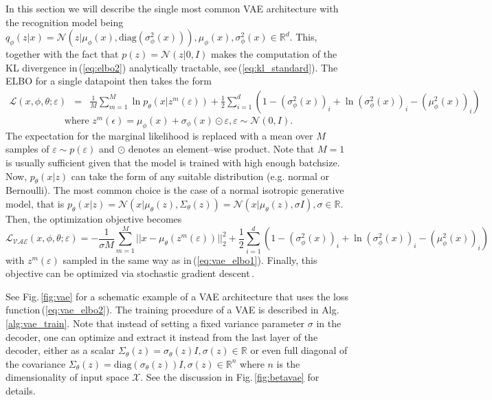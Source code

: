 In this section we will describe the single most common VAE architecture
with the recognition model being $q_{\phi}(z|x)=\mathcal{N}(z|\mu_{\phi}(x),\text{diag}(\sigma_{\phi}^{2}(x))),\mu_{\phi}(x),\sigma_{\phi}^{2}(x)\in\mathbb{R}^{d}$.
This, together with the fact that $p(z)=\mathcal{N}(z|0,I)$ makes
the computation of the KL divergence in\,(\ref{eq:elbo2}) analytically
tractable, see\,(\ref{eq:kl_standard}). The ELBO for a single datapoint
then takes the form
\begin{eqnarray*}
\mathcal{L}(x,\phi,\theta;\varepsilon) & = & \frac{1}{M}\sum_{m=1}^{M}\ln p_{\theta}(x|z^{m}(\varepsilon))+\frac{1}{2}\sum_{i=1}^{d}\left(1-\left(\sigma_{\phi}^{2}(x)\right)_{i}+\ln\left(\sigma_{\phi}^{2}(x)\right)_{i}-\left(\mu_{\phi}^{2}(x)\right)_{i}\right)
\end{eqnarray*}
\begin{equation}
\text{where }z^{m}(\epsilon)=\mu_{\phi}(x)+\sigma_{\phi}(x)\odot\varepsilon,\varepsilon\sim\mathcal{N}(0,I).\label{eq:vae_elbo1}
\end{equation}
The expectation for the marginal likelihood is replaced with a mean
over $M$ samples of $\varepsilon\sim p(\varepsilon)$ and $\odot$
denotes an element--wise product. Note that $M=1$ is usually sufficient
given that the model is trained with high enough batchsize. Now, $p_{\theta}(x|z)$
can take the form of any suitable distribution (e.g. normal or Bernoulli).
The most common choice is the case of a normal isotropic generative
model, that is $p_{\theta}(x|z)=\mathcal{N}(x|\mu_{\theta}(z),\Sigma_{\theta}(z))=\mathcal{N}(x|\mu_{\theta}(z),\sigma I),\sigma\in\mathbb{R}$.
Then, the optimization objective becomes
\begin{equation}
\mathcal{L_{\text{VAE}}}(x,\phi,\theta;\varepsilon)=-\frac{1}{\sigma M}\sum_{m=1}^{M}||x-\mu_{\theta}(z^{m}(\varepsilon))||_{2}^{2}+\frac{1}{2}\sum_{i=1}^{d}\left(1-\left(\sigma_{\phi}^{2}(x)\right)_{i}+\ln\left(\sigma_{\phi}^{2}(x)\right)_{i}-\left(\mu_{\phi}^{2}(x)\right)_{i}\right)\label{eq:vae_elbo2}
\end{equation}
with $z^{m}(\varepsilon)$ sampled in the same way as in\,(\ref{eq:vae_elbo1}).
Finally, this objective can be optimized via stochastic gradient descent\,\cite{bottou2010large}.

See Fig.\,\ref{fig:vae} for a schematic example of a VAE architecture
that uses the loss function\,(\ref{eq:vae_elbo2}). The training
procedure of a VAE is described in Alg.\,\ref{alg:vae_train}. Note
that instead of setting a fixed variance parameter $\sigma$ in the
decoder, one can optimize and extract it instead from the last layer
of the decoder, either as a scalar $\Sigma_{\theta}(z)=\sigma_{\theta}(z)I,\sigma(z)\in\mathbb{R}$
or even full diagonal of the covariance $\Sigma_{\theta}(z)=\text{diag}\left(\sigma_{\theta}(z)\right)I,\sigma(z)\in\mathbb{R}^{n}$
where $n$ is the dimensionality of input space $\mathcal{X}$. See
the discussion in Fig.\,\ref{fig:betavae} for details.

